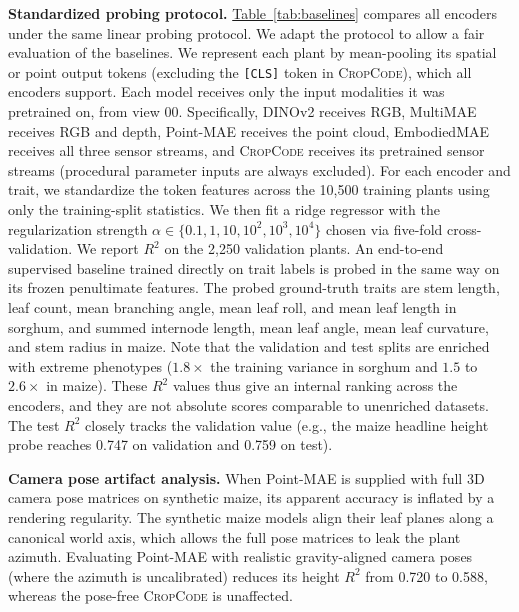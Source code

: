 \documentclass[10pt,twocolumn,letterpaper]{article}
\newcommand{\tabref}[1]{\hyperref[#1]{Table~\ref*{#1}}}
\newcommand{\method}{\textup{\textsc{CropCode}}}   %
\begin{document}
\noindent\textbf{Standardized probing protocol.}
\tabref{tab:baselines} compares all encoders under the same linear probing protocol. We adapt the protocol to allow a fair evaluation of the baselines. We represent each plant by mean-pooling its spatial or point output tokens (excluding the \texttt{[CLS]} token in \method{}), which all encoders support. Each model receives only the input modalities it was pretrained on, from view 00. Specifically, DINOv2 receives RGB, MultiMAE receives RGB and depth, Point-MAE receives the point cloud, EmbodiedMAE receives all three sensor streams, and \method{} receives its pretrained sensor streams (procedural parameter inputs are always excluded). For each encoder and trait, we standardize the token features across the 10{,}500 training plants using only the training-split statistics. We then fit a ridge regressor with the regularization strength $\alpha \in \{0.1, 1, 10, 10^2, 10^3, 10^4\}$ chosen via five-fold cross-validation. We report $R^2$ on the 2{,}250 validation plants. An end-to-end supervised baseline trained directly on trait labels is probed in the same way on its frozen penultimate features. The probed ground-truth traits are stem length, leaf count, mean branching angle, mean leaf roll, and mean leaf length in sorghum, and summed internode length, mean leaf angle, mean leaf curvature, and stem radius in maize. Note that the validation and test splits are enriched with extreme phenotypes ($1.8\times$ the training variance in sorghum and $1.5$ to $2.6\times$ in maize). These $R^2$ values thus give an internal ranking across the encoders, and they are not absolute scores comparable to unenriched datasets. The test $R^2$ closely tracks the validation value (e.g., the maize headline height probe reaches 0.747 on validation and 0.759 on test).

\noindent\textbf{Camera pose artifact analysis.}
When Point-MAE is supplied with full 3D camera pose matrices on synthetic maize, its apparent accuracy is inflated by a rendering regularity. The synthetic maize models align their leaf planes along a canonical world axis, which allows the full pose matrices to leak the plant azimuth. Evaluating Point-MAE with realistic gravity-aligned camera poses (where the azimuth is uncalibrated) reduces its height $R^2$ from 0.720 to 0.588, whereas the pose-free \method{} is unaffected.
\end{document}
